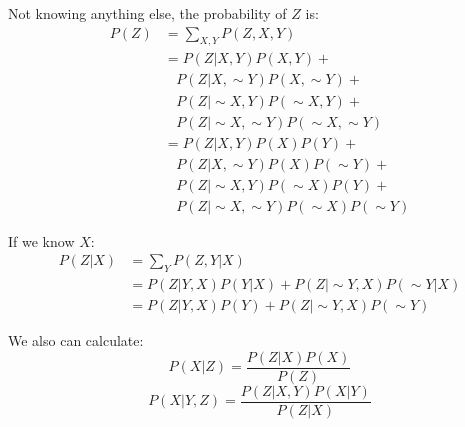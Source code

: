 \begin{multicols}{2}
\noindent Not knowing anything else, the probability of $Z$ is:
\begin{equation*}
\begin{split}
    P(Z) &= \sum_{X,Y} P(Z,X,Y) \\
    &= P(Z|X,Y) P(X,Y) + \\
    &\ \ \ \ P(Z|X,\sim Y) P(X,\sim Y) + \\
    &\ \ \ \ P(Z|\sim X,Y) P(\sim X,Y) + \\
    &\ \ \ \ P(Z|\sim X,\sim Y) P(\sim X,\sim Y) \\
    &= P(Z|X,Y) P(X) P(Y) + \\
    &\ \ \ \ P(Z|X,\sim Y) P(X) P(\sim Y) + \\
    &\ \ \ \ P(Z|\sim X,Y) P(\sim X) P(Y) + \\
    &\ \ \ \ P(Z|\sim X,\sim Y) P(\sim X) P(\sim Y)
\end{split}
\end{equation*}
 
\noindent If we know $X$:
\begin{equation*}
\begin{split}
    P(Z|X) &= \sum_Y P(Z,Y|X)\\
    &= P(Z|Y,X) P(Y|X) + P(Z|\sim Y,X) P(\sim Y|X) \\
    &= P(Z|Y,X) P(Y) + P(Z|\sim Y,X) P(\sim Y) 
\end{split}
\end{equation*}

\noindent We also can calculate:
$$P(X|Z) = \frac{P(Z|X)P(X)}{P(Z)}$$
$$P(X|Y,Z) = \frac{P(Z|X,Y) P(X|Y)}{P(Z|X)}$$

\end{multicols}
